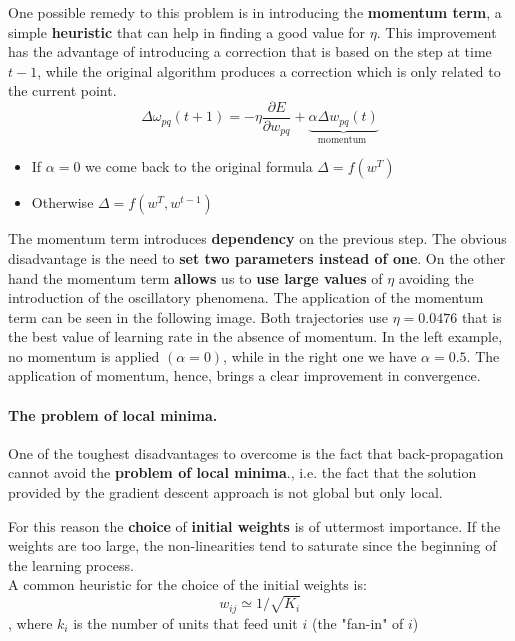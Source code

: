 One possible remedy to this problem is in introducing the \textbf{momentum term}, a simple \textbf{heuristic} that can help in finding a good value for $\eta$. This improvement has the advantage of introducing a correction that is based on the step at time $t-1$, while the original algorithm produces a correction which is only related to the current point.
$$\Delta \omega_{pq}(t+1) = -\eta \frac{\partial E}{\partial w_{pq}}+\underbrace{\alpha \Delta w_{pq} (t)}_{\text{momentum }}$$

\begin{itemize}
	\item If $\alpha = 0$ we come back to the original formula $\Delta = f(w^T)$
	\item Otherwise $\Delta = f(w^T, w^{t-1})$
\end{itemize}
The momentum term introduces \textbf{dependency} on the previous step. The obvious disadvantage is the need to \textbf{set two parameters instead of one}. On the other hand the momentum term \textbf{allows} us to \textbf{use large values} of $\eta$ avoiding the introduction of the oscillatory phenomena. The application of the momentum term can be seen in the following image.
Both trajectories use $\eta=0.0476$ that is the best value of learning rate in the absence of momentum. In the left example, no momentum is applied $(\alpha=0)$, while in the right one we have $\alpha=0.5$. The application of momentum, hence, brings a clear improvement in convergence.

\paragraph*{The problem of local minima.} One of the toughest disadvantages to overcome is the fact that back-propagation cannot avoid the \textbf{problem of local minima}., i.e. the fact that the solution provided by the gradient descent approach is not global but only local.


For this reason the \textbf{choice} of \textbf{initial weights} is of uttermost importance. If the weights are too large, the non-linearities tend to saturate since the beginning of the learning process. \\
A common heuristic for the choice of the initial weights is: 
$$w_{ij} \simeq 1/\sqrt{K_i}$$
, where $k_i$ is the number of units that feed unit $i$ (the "fan-in" of $i$)

